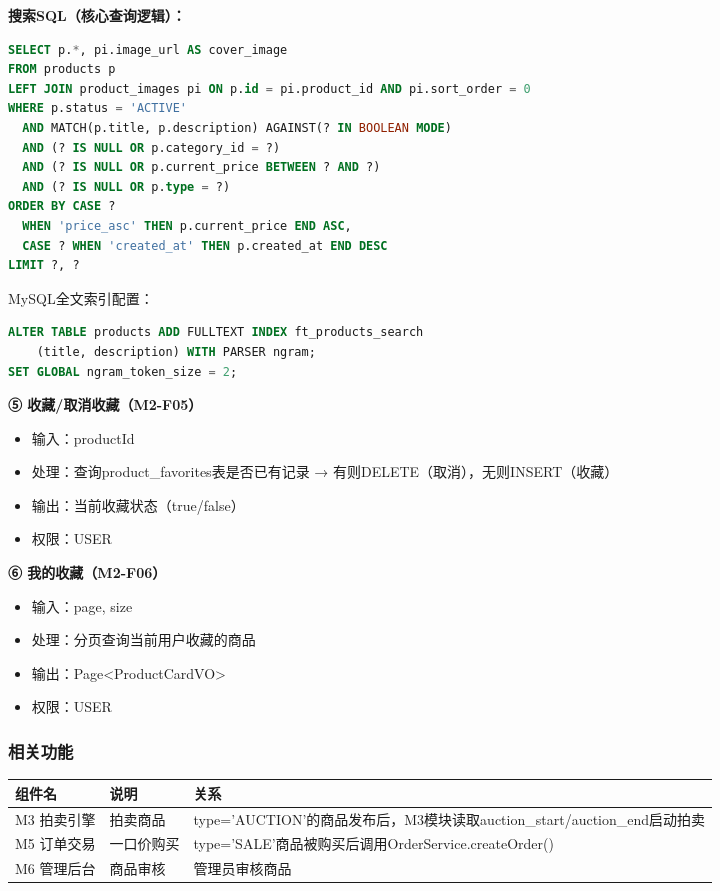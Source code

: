 \documentclass[12pt,a4paper]{ctexart}
\numberwithin{figure}{section}
\numberwithin{table}{section}
\begin{document}
\textbf{搜索SQL（核心查询逻辑）：}

\begin{lstlisting}[language=sql]
SELECT p.*, pi.image_url AS cover_image
FROM products p
LEFT JOIN product_images pi ON p.id = pi.product_id AND pi.sort_order = 0
WHERE p.status = 'ACTIVE'
  AND MATCH(p.title, p.description) AGAINST(? IN BOOLEAN MODE)
  AND (? IS NULL OR p.category_id = ?)
  AND (? IS NULL OR p.current_price BETWEEN ? AND ?)
  AND (? IS NULL OR p.type = ?)
ORDER BY CASE ?
  WHEN 'price_asc' THEN p.current_price END ASC,
  CASE ? WHEN 'created_at' THEN p.created_at END DESC
LIMIT ?, ?
\end{lstlisting}

MySQL全文索引配置：

\begin{lstlisting}[language=sql]
ALTER TABLE products ADD FULLTEXT INDEX ft_products_search
    (title, description) WITH PARSER ngram;
SET GLOBAL ngram_token_size = 2;
\end{lstlisting}

\textbf{⑤ 收藏/取消收藏（M2-F05）}

\begin{itemize}
    \item 输入：productId
    \item 处理：查询product\_favorites表是否已有记录 → 有则DELETE（取消），无则INSERT（收藏）
    \item 输出：当前收藏状态（true/false）
    \item 权限：USER
\end{itemize}

\textbf{⑥ 我的收藏（M2-F06）}

\begin{itemize}
    \item 输入：page, size
    \item 处理：分页查询当前用户收藏的商品
    \item 输出：Page<ProductCardVO>
    \item 权限：USER
\end{itemize}

\subsubsection{相关功能}

\begin{center}
\renewcommand{\arraystretch}{1.3}
\begin{tabular}{|p{3cm}|p{4cm}|p{7cm}|}
\hline
\rowcolor{tableheader}
\textbf{组件名} & \textbf{说明} & \textbf{关系} \\
\hline
M3 拍卖引擎 & 拍卖商品 & type='AUCTION'的商品发布后，M3模块读取auction\_start/auction\_end启动拍卖 \\
\hline
M5 订单交易 & 一口价购买 & type='SALE'商品被购买后调用OrderService.createOrder() \\
\hline
M6 管理后台 & 商品审核 & 管理员审核商品 \\
\hline
\end{tabular}
\end{center}
\end{document}
